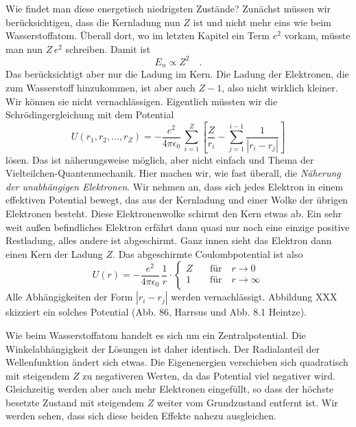 Wie findet man diese energetisch niedrigsten Zustände? Zunächst müssen wir berücksichtigen, dass die Kernladung nun $Z$ ist und nicht mehr eins wie beim Wasserstoffatom. Überall dort, wo im letzten Kapitel ein Term $e^2$ vorkam, müsste man nun $Z \, e^2$ schreiben. Damit ist 
\begin{equation}
    E_n \propto Z^2  \quad .
\end{equation}
Das  berücksichtigt aber nur die Ladung im Kern. Die Ladung der Elektronen, die zum Wasserstoff hinzukommen, ist aber auch $Z-1$, also nicht wirklich kleiner. Wir können sie nicht vernachlässigen. Eigentlich müssten wir die Schrödingergleichung mit dem Potential
\begin{equation}
    U(r_1, r_2, \dots, r_Z) = -\frac{e^2}{4 \pi \epsilon_0} \, \sum_{i=1}^Z  \left[  \frac{Z}{r_i} - \sum_{j=1}^{i-1}  \frac{1}{|r_i - r_j|} \right]
\end{equation} 
lösen. Das ist näherungsweise möglich, aber nicht einfach und Thema der Vielteilchen-Quantenmechanik. Hier machen wir, wie fast überall, die \emph{Näherung der unabhängigen Elektronen}. Wir nehmen an, dass sich jedes Elektron in einem effektiven Potential bewegt, das aus der Kernladung und einer Wolke der übrigen Elektronen besteht. Diese Elektronenwolke schirmt den Kern etwas ab. Ein sehr weit außen befindliches Elektron erfährt dann quasi nur noch eine einzige positive Restladung, alles andere ist abgeschirmt. Ganz innen sieht das Elektron dann einen Kern der Ladung $Z$. Das abgeschirmte Coulombpotential ist also
\begin{equation}
    U(r) =  -\frac{e^2}{4 \pi \epsilon_0} \, \frac{1}{r} \cdot
    \left\{
 \begin{matrix}
     Z \quad  & \text{für} \quad  r  \rightarrow  0 \\
     1     & \text{für} \quad  r \rightarrow \infty \\
 \end{matrix}
    \right.
\end{equation}
Alle Abhängigkeiten der Form $|r_i - r_j|$ werden vernachlässigt. Abbildung XXX skizziert ein solches Potential (Abb. 86, Harrsus und Abb. 8.1 Heintze).


Wie beim Wasserstoffatom handelt es sich um ein Zentralpotential. Die Winkelabhängigkeit der Lösungen ist daher identisch. Der Radialanteil der Wellenfunktion ändert sich etwas. Die Eigenenergien verschieben sich quadratisch mit steigendem $Z$ zu negativeren Werten, da das Potential viel negativer wird. Gleichzeitig werden aber auch mehr Elektronen eingefüllt, so dass der höchste besetzte Zustand mit steigendem $Z$ weiter vom Grundzustand entfernt ist. Wir werden sehen, dass sich diese beiden Effekte nahezu ausgleichen.


